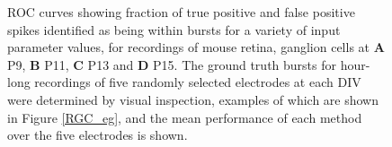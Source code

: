 \documentclass[12pt, titlepage]{article}
\begin{document}
		\begin{figure}[h]
			\centering
			\caption{ROC curves showing fraction of true positive and false positive spikes identified as being within bursts for a variety of input parameter values, for recordings of mouse retina, ganglion cells at \textbf{A} P9, \textbf{B} P11,  \textbf{C} P13 and \textbf{D} P15. The ground truth bursts for hour-long recordings of five randomly selected electrodes at each DIV were determined by visual inspection, examples of which are shown in Figure \ref{RGC_eg}, and the mean performance of each method over the five electrodes is shown.}
			\label{ROC}
		\end{figure}  
\end{document}
